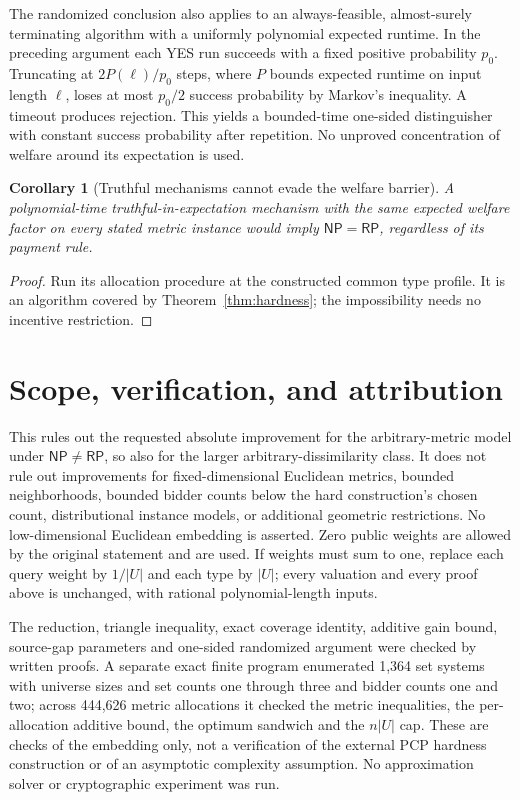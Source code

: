 \documentclass[11pt]{article}
\newtheorem{corollary}[theorem]{Corollary}
\newcommand{\NP}{\mathsf{NP}}
\newcommand{\RP}{\mathsf{RP}}
\begin{document}
The randomized conclusion also applies to an always-feasible, almost-surely terminating algorithm with a uniformly polynomial expected runtime. In the preceding argument each YES run succeeds with a fixed positive probability $p_0$. Truncating at $2P(\ell)/p_0$ steps, where $P$ bounds expected runtime on input length $\ell$, loses at most $p_0/2$ success probability by Markov's inequality. A timeout produces rejection. This yields a bounded-time one-sided distinguisher with constant success probability after repetition. No unproved concentration of welfare around its expectation is used.

\begin{corollary}[Truthful mechanisms cannot evade the welfare barrier]
A polynomial-time truthful-in-expectation mechanism with the same expected welfare factor on every stated metric instance would imply $\NP=\RP$, regardless of its payment rule.
\end{corollary}
\begin{proof}
Run its allocation procedure at the constructed common type profile. It is an algorithm covered by Theorem~\ref{thm:hardness}; the impossibility needs no incentive restriction.
\end{proof}

\section{Scope, verification, and attribution}
This rules out the requested absolute improvement for the arbitrary-metric model under $\NP\ne\RP$, so also for the larger arbitrary-dissimilarity class. It does not rule out improvements for fixed-dimensional Euclidean metrics, bounded neighborhoods, bounded bidder counts below the hard construction's chosen count, distributional instance models, or additional geometric restrictions. No low-dimensional Euclidean embedding is asserted. Zero public weights are allowed by the original statement and are used. If weights must sum to one, replace each query weight by $1/|U|$ and each type by $|U|$; every valuation and every proof above is unchanged, with rational polynomial-length inputs.

The reduction, triangle inequality, exact coverage identity, additive gain bound, source-gap parameters and one-sided randomized argument were checked by written proofs. A separate exact finite program enumerated 1,364 set systems with universe sizes and set counts one through three and bidder counts one and two; across 444,626 metric allocations it checked the metric inequalities, the per-allocation additive bound, the optimum sandwich and the $n|U|$ cap. These are checks of the embedding only, not a verification of the external PCP hardness construction or of an asymptotic complexity assumption. No approximation solver or cryptographic experiment was run.
\end{document}
